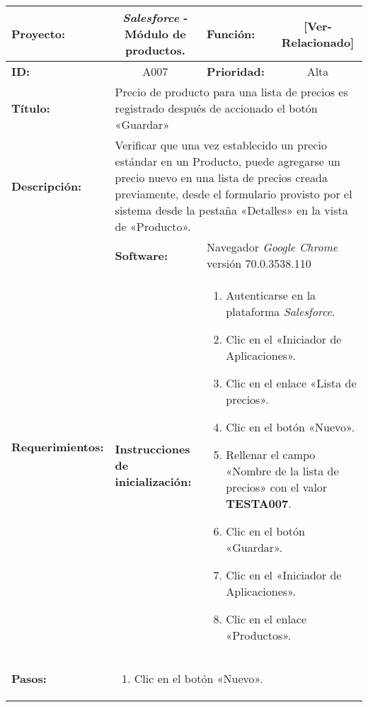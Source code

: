 \begin{table}[H]
\centering
\begin{tabular}{|p{2.5cm}|p{2.8cm}|p{2.2cm}|p{2.8cm}|p{2.2cm}|}
\hline
\footnotesize{\textbf{Proyecto:}} &
\multicolumn{2}{c|}{\footnotesize{\emph{Salesforce} - Módulo de productos.}} &
\footnotesize{\textbf{Función:}} &
\multicolumn{1}{c|}{\footnotesize{[Ver-Relacionado]}} \\
\hline
\footnotesize{\textbf{ID:}} & \multicolumn{2}{c|}{\footnotesize{A007}} &
\footnotesize{\textbf{Prioridad:}} &
\multicolumn{1}{c|}{\footnotesize{Alta}} \\
\hline
\footnotesize{\textbf{Título:}} &
\multicolumn{4}{p{12.4cm}|}{\footnotesize{Precio de producto para una lista de
precios es registrado después de accionado el botón «Guardar»}} \\
\hline
\footnotesize{\textbf{Descripción:}} &
\multicolumn{4}{p{12.4cm}|}{\footnotesize{Verificar que una vez establecido un
precio estándar en un Producto, puede agregarse un precio nuevo en una lista de
precios creada previamente, desde el formulario provisto por el sistema desde
la pestaña «Detalles» en la vista de «Producto».}} \\
\hline
\multirow{2}{*}{\footnotesize{\textbf{Requerimientos:}}} &
\footnotesize{\textbf{Software:}} &
\multicolumn{3}{p{7.8cm}|}{\footnotesize{Navegador \emph{Google Chrome}
versión 70.0.3538.110}} \\
\cline{2-5}
& \footnotesize{\textbf{Instrucciones de inicialización:}} &
\multicolumn{3}{p{7.8cm}|}{\footnotesize{
\begin{enumerate}
\item Autenticarse en la plataforma \emph{Salesforce}.
\item Clic en el «Iniciador de Aplicaciones».
\item Clic en el enlace «Lista de precios».
\item Clic en el botón «Nuevo».
\item Rellenar el campo «Nombre de la lista de precios» con el valor
    \textbf{TESTA007}.
\item Clic en el botón «Guardar».
\item Clic en el «Iniciador de Aplicaciones».
\item Clic en el enlace «Productos».
\end{enumerate}
}} \\
\hline
\footnotesize{\textbf{Pasos:}} &
\multicolumn{4}{p{11.8cm}|}{\footnotesize{
\begin{enumerate}
\item Clic en el botón «Nuevo».

\end{enumerate}}}
\end{tabular}
\end{table}
